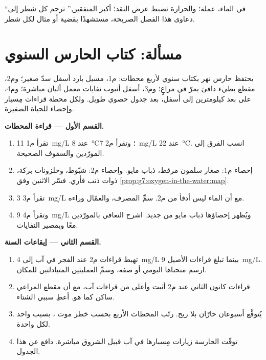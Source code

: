 \begin{exercise}[$\star\star\star$]\label{exo:g7:oxygen-in-the-water:12}
``في الماء،  عملة؛ والحرارة تضبط عرض النقد؛ 
أكبر المنفقين.'' ترجم كل شطر إلى دعاوى هذا الفصل الصريحة، مستشهدًا
بقضية أو مثال لكل شطر.
\end{exercise}

\section{مسألة: كتاب الحارس السنوي}

\begin{problem}\label{pb:g7:oxygen-in-the-water:1}
يحتفظ حارس نهر بكتاب سنوي لأربع محطات: م1، مسيل بارد أسفل سدّ
صغير؛ وم2، مقطع بطيء دافئ يمرّ في مراعٍ؛ وم3، أسفل أنبوب نفايات
معمل ألبان مباشرة؛ وم4، على بعد كيلومترين إلى أسفل، بعد جدول حصوي
طويل. ولكل محطة قراءات مِسبار وإحصاء للحياة الصغيرة.

\medskip\noindent\textbf{القسم الأول --- قراءة المحطات.}
\begin{enumerate}
  \item تقرأ م1 \qty{11}{mg/L} عند
        \qty{8}{\degreeCelsius}؛ وتقرأ م2 \qty{7}{mg/L}
        عند \qty{22}{\degreeCelsius}. انسب الفرق إلى المورّدين
        والسقوف الصحيحة.
  \item إحصاء م1: صغار سلمون مرقط،  ذباب مايو. وإحصاء م2:
        شبّوط، وحلزونات بركة،  ذوات ذنب فأري. فسّر
        الاثنين وفق \cref{prop:g7:oxygen-in-the-water:map}.
  \item تقرأ م3 \qty{3}{mg/L} مع أن الماء ليس أدفأ من م2. سمِّ
        المصرف، والعمّال وراءه.
  \item وتقرأ م4 \qty{9}{mg/L} ويُظهر إحصاؤها  ذباب مايو من
        جديد. اشرح التعافي بالمورّدين معًا وبمصير النفايات.
\end{enumerate}

\medskip\noindent\textbf{القسم الثاني --- إيقاعات السنة.}
\begin{enumerate}[resume]
  \item تهبط قراءات م2 عند الفجر في آب إلى
        \qty{4}{mg/L} بينما تبلغ قراءات الأصيل \qty{9}{mg/L}.
        ارسم منحناها اليومي أو صفه، وسمِّ العمليتين المتبادلتين
        للمكان.
  \item قراءات كانون الثاني عند م2 أثبت وأعلى من قراءات آب، مع
        أن مقطع المراعي ساكن كما هو. أعطِ سببي الشتاء.
  \item يُتوقَّع أسبوعان حارّان بلا ريح. رتّب المحطات الأربع بحسب
        خطر موت ، بسبب واحد لكل واحدة.
  \item توقّت الحارسة زيارات مِسبارها في آب قبيل الشروق مباشرة.
        دافع عن هذا الجدول.
\end{enumerate}


\end{problem}
